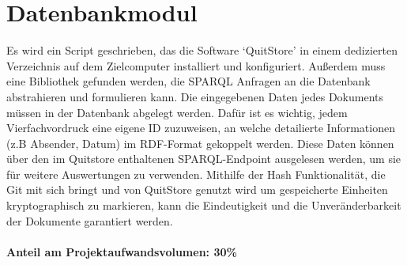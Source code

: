 \section{Datenbankmodul}
       
Es wird ein Script geschrieben, das die Software `QuitStore' in einem
dedizierten Verzeichnis auf dem Zielcomputer installiert und konfiguriert.
Außerdem muss eine Bibliothek gefunden werden, die SPARQL Anfragen an die
Datenbank abstrahieren und formulieren kann.
Die eingegebenen Daten jedes Dokuments müssen in der Datenbank abgelegt werden.
Dafür ist es wichtig, jedem Vierfachvordruck eine eigene ID zuzuweisen, an welche detailierte Informationen (z.B Absender, Datum) im RDF-Format gekoppelt werden.
Diese Daten können über den im Quitstore enthaltenen SPARQL-Endpoint ausgelesen werden, um sie für weitere Auswertungen zu verwenden.
Mithilfe der Hash Funktionalität, die Git mit sich bringt und von QuitStore
genutzt wird um gespeicherte Einheiten kryptographisch zu markieren, kann die
Eindeutigkeit und die Unveränderbarkeit der Dokumente garantiert werden. 
\\
\\
\textbf{Anteil am Projektaufwandsvolumen: 30\%}